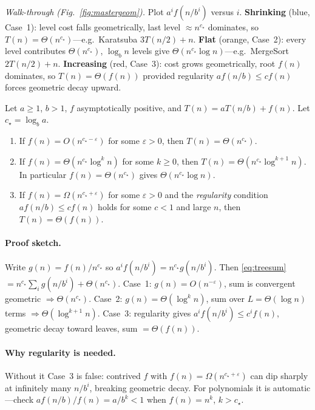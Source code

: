 \textit{Walk-through (Fig.~\ref{fig:mastergeom}).} Plot $a^{i}f(n/b^{i})$ versus $i$. \textbf{Shrinking} (blue, Case~1): level cost falls geometrically, last level $\approx n^{c_{\star}}$ dominates, so $T(n)=\Theta(n^{c_{\star}})$---e.g.\ Karatsuba $3T(n/2)+n$. \textbf{Flat} (orange, Case~2): every level contributes $\Theta(n^{c_{\star}})$, $\log_{b}n$ levels give $\Theta(n^{c_{\star}}\log n)$---e.g.\ MergeSort $2T(n/2)+n$. \textbf{Increasing} (red, Case~3): cost grows geometrically, root $f(n)$ dominates, so $T(n)=\Theta(f(n))$ provided regularity $af(n/b)\le cf(n)$ forces geometric decay upward.

\begin{theorem}\label{thm:master}
Let $a\ge 1$, $b>1$, $f$ asymptotically positive, and $T(n)=aT(n/b)+f(n)$. Let $c_{\star}=\log_{b}a$.
\begin{enumerate}[label=Case~\arabic*:,leftmargin=*]
\item If $f(n)=O(n^{c_{\star}-\varepsilon})$ for some $\varepsilon>0$, then $T(n)=\Theta(n^{c_{\star}})$.
\item If $f(n)=\Theta(n^{c_{\star}}\log^{k}n)$ for some $k\ge 0$, then $T(n)=\Theta(n^{c_{\star}}\log^{k+1}n)$. In particular $f(n)=\Theta(n^{c_{\star}})$ gives $\Theta(n^{c_{\star}}\log n)$.
\item If $f(n)=\Omega(n^{c_{\star}+\varepsilon})$ for some $\varepsilon>0$ and the \emph{regularity} condition $af(n/b)\le cf(n)$ holds for some $c<1$ and large $n$, then $T(n)=\Theta(f(n))$.
\end{enumerate}
\end{theorem}
\paragraph{Proof sketch.} Write $g(n)=f(n)/n^{c_{\star}}$ so $a^{i}f(n/b^{i})=n^{c_{\star}}g(n/b^{i})$. Then \eqref{eq:treesum} $=n^{c_{\star}}\sum_{i}g(n/b^{i})+\Theta(n^{c_{\star}})$.
Case~1: $g(n)=O(n^{-\varepsilon})$, sum is convergent geometric $\Rightarrow\Theta(n^{c_{\star}})$.
Case~2: $g(n)=\Theta(\log^{k}n)$, sum over $L=\Theta(\log n)$ terms $\Rightarrow\Theta(\log^{k+1}n)$.
Case~3: regularity gives $a^{i}f(n/b^{i})\le c^{i}f(n)$, geometric decay toward leaves, sum $=\Theta(f(n))$.
\paragraph{Why regularity is needed.} Without it Case~3 is false: contrived $f$ with $f(n)=\Omega(n^{c_{\star}+\varepsilon})$ can dip sharply at infinitely many $n/b^{i}$, breaking geometric decay. For polynomials it is automatic---check $af(n/b)/f(n)=a/b^{k}<1$ when $f(n)=n^{k}$, $k>c_{\star}$.
